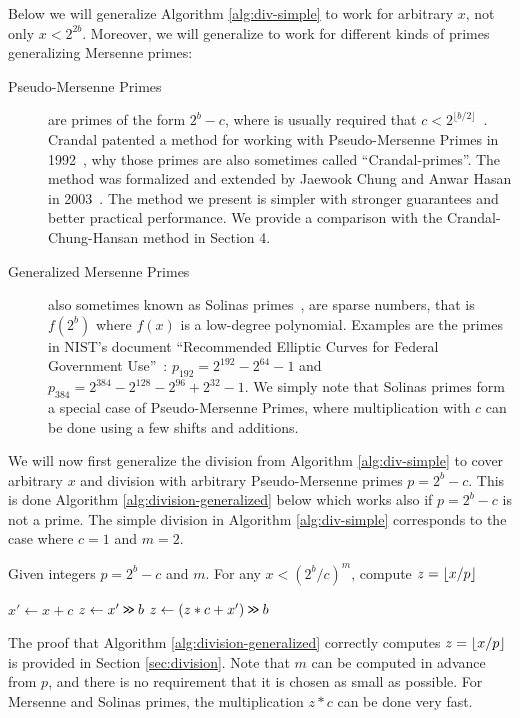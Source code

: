 Below we will generalize Algorithm \ref{alg:div-simple} to work for
arbitrary $x$, not only $x<2^{2b}$. Moreover, we will generalize
to work for different kinds of primes generalizing Mersenne primes:
\begin{description}
   \item[Pseudo-Mersenne Primes]
      are primes of the form $2^b-c$, where is usually required that $c < 2^{\lfloor b/2\rfloor}$~\cite{van2014encyclopedia}.
      Crandal patented a method for working with Pseudo-Mersenne Primes in 1992~\cite{crandall1992method},
      why those primes are also sometimes called ``Crandal-primes''.
      The method was formalized and extended by Jaewook Chung and Anwar Hasan in 2003~\cite{chung2003more}. The method we present is simpler with
      stronger guarantees and better practical performance.
      We provide a comparison with the Crandal-Chung-Hansan method in Section 4.
   \item[Generalized Mersenne Primes]
      also sometimes known as Solinas primes~\cite{Solinas2011}, are sparse numbers, that is $f(2^b)$ where $f(x)$ is a low-degree polynomial.
      Examples are the primes in NIST's document ``Recommended Elliptic Curves for Federal Government Use''~\cite{nist}:
         $p_{192} = 2^{192} - 2^{64} - 1$
      and
         $p_{384} = 2^{384}-2^{128}-2^{96}+2^{32}-1$.
      We simply note that Solinas primes form a special case of
      Pseudo-Mersenne Primes, where multiplication with $c$
      can be done using a few shifts and additions.
\end{description}
We will now first generalize the division from Algorithm \ref{alg:div-simple}
to cover arbitrary $x$ and division with arbitrary Pseudo-Mersenne primes $p=2^b-c$. This is done Algorithm \ref{alg:division-generalized} below which
works also if $p=2^b-c$ is not a prime.  The
simple division in Algorithm \ref{alg:div-simple} corresponds to the case
where $c=1$ and $m=2$.
\begin{algorithm}[H]
  \caption{Given integers $p=2^b-c$ and $m$.
    For any $x< (2^b/c)^m$, compute $z=\lfloor {x/p} \rfloor$}
   \label{alg:division-generalized}
   \begin{algorithmic}
         \State $x' \gets x + c$
         \State $z \gets x' \mathbin{\texttt{>\!>}} b$
            \State $z \gets (z * c + x')\mathbin{\texttt{>\!>}} b$
         \EndFor
   \end{algorithmic}
\end{algorithm}
The proof that Algorithm \ref{alg:division-generalized} correctly computes
 $z=\lfloor {x/p} \rfloor$ is provided in Section \ref{sec:division}.
Note that $m$ can be computed in advance from $p$, and there is no requirement that it is chosen as small as possible.
For Mersenne and Solinas primes, the multiplication $z*c$ can be done very fast.

